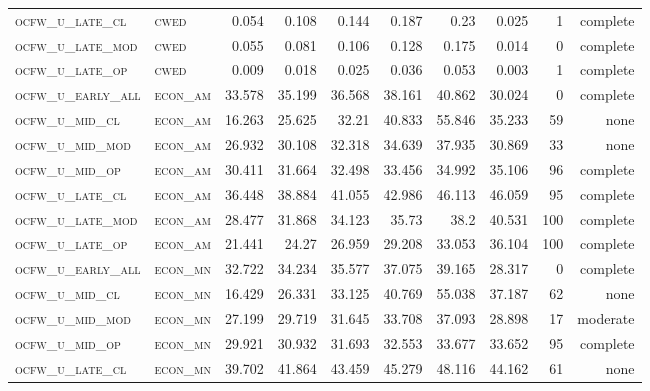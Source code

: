 \begin{landscape}
\begin{center}
\begin{footnotesize}
\begin{longtable}{llrrrrr|rrr}
\textsc{ocfw\_u\_late\_cl  } & \textsc{cwed      }    & 0.054    & 0.108    & 0.144    & 0.187    & 0.23     & 0.025    & 1   & complete \\
\textsc{ocfw\_u\_late\_mod } & \textsc{cwed      }    & 0.055    & 0.081    & 0.106    & 0.128    & 0.175    & 0.014    & 0   & complete \\
\textsc{ocfw\_u\_late\_op  } & \textsc{cwed      }    & 0.009    & 0.018    & 0.025    & 0.036    & 0.053    & 0.003    & 1   & complete \\
\textsc{ocfw\_u\_early\_all} & \textsc{econ\_am  }    & 33.578   & 35.199   & 36.568   & 38.161   & 40.862   & 30.024   & 0   & complete \\
\textsc{ocfw\_u\_mid\_cl   } & \textsc{econ\_am  }    & 16.263   & 25.625   & 32.21    & 40.833   & 55.846   & 35.233   & 59  & none     \\
\textsc{ocfw\_u\_mid\_mod  } & \textsc{econ\_am  }    & 26.932   & 30.108   & 32.318   & 34.639   & 37.935   & 30.869   & 33  & none     \\
\textsc{ocfw\_u\_mid\_op   } & \textsc{econ\_am  }    & 30.411   & 31.664   & 32.498   & 33.456   & 34.992   & 35.106   & 96  & complete \\
\textsc{ocfw\_u\_late\_cl  } & \textsc{econ\_am  }    & 36.448   & 38.884   & 41.055   & 42.986   & 46.113   & 46.059   & 95  & complete \\
\textsc{ocfw\_u\_late\_mod } & \textsc{econ\_am  }    & 28.477   & 31.868   & 34.123   & 35.73    & 38.2     & 40.531   & 100 & complete \\
\textsc{ocfw\_u\_late\_op  } & \textsc{econ\_am  }    & 21.441   & 24.27    & 26.959   & 29.208   & 33.053   & 36.104   & 100 & complete \\
\textsc{ocfw\_u\_early\_all} & \textsc{econ\_mn  }    & 32.722   & 34.234   & 35.577   & 37.075   & 39.165   & 28.317   & 0   & complete \\
\textsc{ocfw\_u\_mid\_cl   } & \textsc{econ\_mn  }    & 16.429   & 26.331   & 33.125   & 40.769   & 55.038   & 37.187   & 62  & none     \\
\textsc{ocfw\_u\_mid\_mod  } & \textsc{econ\_mn  }    & 27.199   & 29.719   & 31.645   & 33.708   & 37.093   & 28.898   & 17  & moderate \\
\textsc{ocfw\_u\_mid\_op   } & \textsc{econ\_mn  }    & 29.921   & 30.932   & 31.693   & 32.553   & 33.677   & 33.652   & 95  & complete \\
\textsc{ocfw\_u\_late\_cl  } & \textsc{econ\_mn  }    & 39.702   & 41.864   & 43.459   & 45.279   & 48.116   & 44.162   & 61  & none     \\

\end{longtable}
\end{footnotesize}
\end{center}
\end{landscape}
